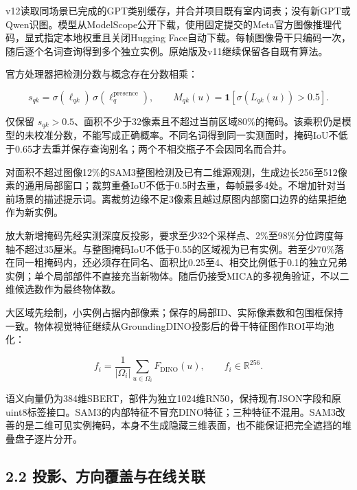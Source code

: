 \documentclass[UTF8,fontset=fandol]{ctexart}
\begin{document}
v12读取同场景已完成的GPT类别缓存，并合并项目既有室内词表；没有新GPT或Qwen识图。模型从ModelScope公开下载，使用固定提交的Meta官方图像推理代码，显式指定本地权重且关闭Hugging Face自动下载。每帧图像骨干只编码一次，随后逐个名词查询得到多个独立实例。原始版及v11继续保留各自既有算法。



官方处理器把检测分数与概念存在分数相乘：



\[
s_{qk}=\sigma(\ell_{qk})\,\sigma(\ell_q^{\mathrm{presence}}),\qquad
M_{qk}(u)=\mathbf1[\sigma(L_{qk}(u))>0.5].
\]

仅保留 $s_{qk}>0.5$、面积不少于32像素且不超过当前区域80\%的掩码。该乘积仍是模型的未校准分数，不能写成正确概率。不同名词得到同一实测面时，掩码IoU不低于0.65才去重并保存查询别名；两个不相交瓶子不会因同名而合并。



对面积不超过图像12\%的SAM3整图检测及已有二维源观测，生成边长256至512像素的通用局部窗口；裁剪重叠IoU不低于0.5时去重，每帧最多4处。不增加针对当前场景的描述提示词。离裁剪边缘不足3像素且越过原图内部窗口边界的结果拒绝作为新实例。



放大新增掩码先经实测深度反投影，要求至少32个采样点、2\%至98\%分位跨度每轴不超过35厘米。与整图掩码IoU不低于0.55的区域视为已有实例。若至少70\%落在同一粗掩码内，还必须存在同名、面积比0.25至4、相交比例低于0.1的独立兄弟实例；单个局部部件不直接充当新物体。随后仍接受MICA的多视角验证，不以二维候选数作为最终物体数。



大区域先绘制，小实例占据内部像素；保存的局部ID、实际像素数和包围框保持一致。物体视觉特征继续从GroundingDINO投影后的骨干特征图作ROI平均池化：



\[
f_i=\frac{1}{|\Omega_i|}\sum_{u\in\Omega_i}F_{\mathrm{DINO}}(u),\qquad f_i\in\mathbb R^{256}.
\]

语义向量仍为384维SBERT，部件为独立1024维RN50，保持现有JSON字段和原uint8标签接口。SAM3的内部特征不冒充DINO特征；三种特征不混用。SAM3改善的是二维可见实例掩码，本身不生成隐藏三维表面，也不能保证把完全遮挡的堆叠盘子逐片分开。



\subsection*{2.2 投影、方向覆盖与在线关联}
\end{document}
